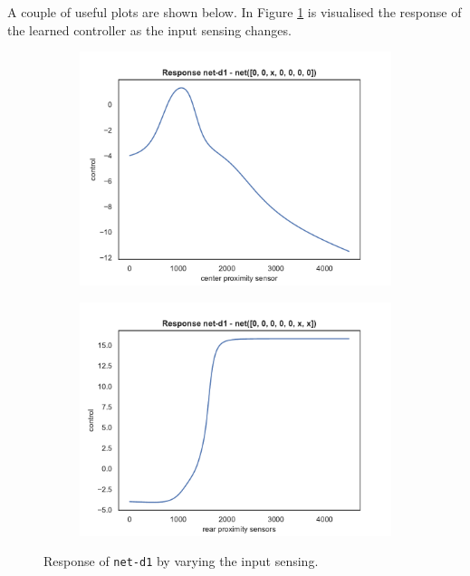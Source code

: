 \bigskip
\bigskip
A couple of useful plots are shown below. In Figure 
\ref{fig:net-d1responsesensors} is visualised the response of the learned 
controller as the input sensing changes. 
\begin{figure}[!htb]
	\centering
	\begin{subfigure}[h]{0.49\textwidth}
		\centering
		\includegraphics[width=\textwidth]{contents/images/net-d1/response-net-d1-front}%
	\end{subfigure}
	\hfill
	\begin{subfigure}[h]{0.49\textwidth}
		\centering
		\includegraphics[width=\textwidth]{contents/images/net-d1/response-net-d1-rear}
	\end{subfigure}
	\caption[Response of \texttt{net-d1} by varying the input sensing.]{Response of 
		\texttt{net-d1} by varying the input sensing.}
	\label{fig:net-d1responsesensors}
\end{figure}

